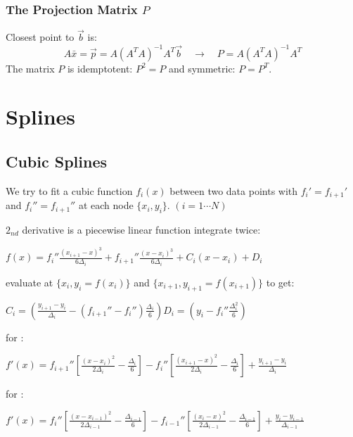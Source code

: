 \documentclass[8pt,a4paper]{scrartcl}
\begin{document}
\begin{multicols*}{3}
\subsubsection{The Projection Matrix $P$}

Closest point to $\vec b$ is:
\begin{equation*}
A \bar{x} = \vec p = A(A^TA)^{-1}A^T \vec b \quad \rightarrow \quad P = A(A^TA)^{-1}A^T
\end{equation*}
The matrix $P$ is idemptotent: $P^2 = P$ and symmetric: $P = P^T$.


\section{Splines}


\subsection{Cubic Splines}

We try to fit a cubic function $f_i(x)$ between two data points with $f_i' = f_{i+1}'$ and $f_i'' = f_{i+1}''$ at each node $\{ x_{i} , y_{i} \}$. $(i=1\cdots N)$

\begin{center}
$2_{nd}$ derivative is a piecewise linear function \dahe integrate twice:

\finn

$f(x) = f_i ''\! \frac{(x_{i+1} -x)^3}{6 \Delta_i} + f_{i+1} '' \frac{(x-x_i)^3}{6 \Delta_i} + C_i(x-x_i) + D_i$

\finn

evaluate at $\{x_i,y_i=f(x_i)\}$ and $\{x_{i+1},y_{i+1}=f(x_{i+1})\}$ to get:

\finn

$C_i=\left( \frac{y_{i+1}-y_i}{\Delta_i} - (f_{i+1}'' - f_i '') \frac{\Delta_i}{6} \right)$\hfill$D_i=\left(y_i-f_i'' \frac{\Delta_i ^2}{6} \right)$
\normalsize
\end{center}

\finn
for : 

$f'(x)=f_{i+1}''\left[\frac{(x-x_i)^2}{2\Delta_i}-\frac{\Delta_i}{6}\right]-f_i''\left[\frac{(x_{i+1}-x)^2}{2\Delta_i}-\frac{\Delta_i}{6}\right]+\frac{y_{i+1}-y_i}{\Delta_i}$

for :

$f'(x)=f_i''\left[\frac{(x-x_{i-1})^2}{2\Delta_{i-1}}-\frac{\Delta_{i-1}}{6}\right]-f_{i-1}''\left[\frac{(x_i-x)^2}{2\Delta_{i-1}}-\frac{\Delta_{i-1}}{6}\right]+\frac{y_i-y_{i-1}}{\Delta_{i-1}}$


\end{multicols*}
\end{document}
